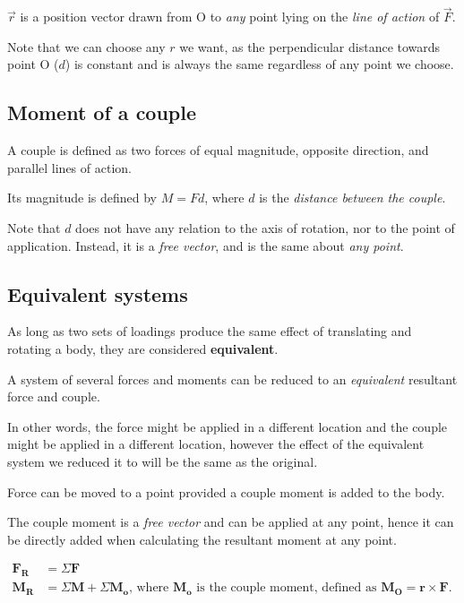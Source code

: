 \documentclass{scrartcl}
\begin{document}
\(\vec{r}\) is a position vector drawn from O to \emph{any} point lying on the \emph{line of action} of 
\(\vec{F}\).

Note that we can choose any \(r\) we want, 
as the perpendicular distance towards point O (\(d\)) is constant and 
is always the same regardless of any point we choose.


\subsection{Moment of a couple}
A couple is defined as two forces of equal magnitude, 
opposite direction, and parallel lines of action.

Its magnitude is defined by \(M = Fd\), where \(d\) is the \emph{distance between the couple}.

Note that \(d\) does not have any relation to the axis of rotation, nor to the point of application.
Instead, it is a \emph{free vector}, and is the same about \emph{any point}.

\subsection{Equivalent systems}

As long as two sets of loadings produce the same effect of translating and rotating a body, 
they are considered \textbf{equivalent}.

A system of several forces and moments can be reduced to an \emph{equivalent} resultant force and couple.

In other words, the force might be applied in a different location and the couple might be applied in a different location, 
however the effect of the equivalent system we reduced it to will be the same as the original.

Force can be moved to a point provided a couple moment is added to the body.

The couple moment is a \emph{free vector} and can be applied at any point, 
hence it can be directly added when calculating the resultant moment at any point.

\begin{math}
    \begin{aligned}
        \mathbf{F_R} &= \Sigma \mathbf{F} \\
        \mathbf{M_R} &= \Sigma \mathbf{M} + \Sigma \mathbf{M_o} 
        \text{, where } \mathbf{M_o} \text{ is the couple moment, defined as } \mathbf{M_O} = \mathbf{r} \times \mathbf{F} \text{.}
    \end{aligned}
\end{math}
\end{document}
